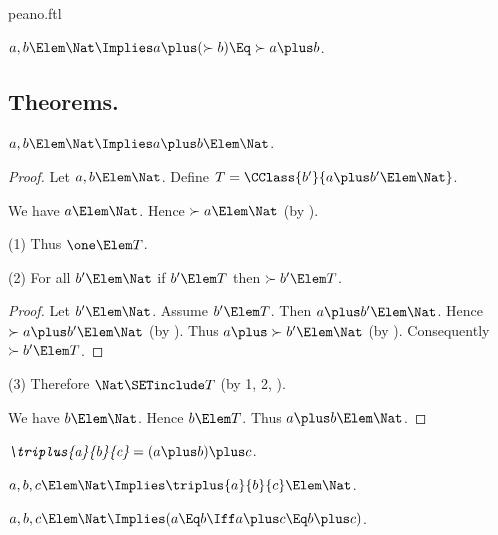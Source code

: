 \documentclass{stex}
\begin{document}
\begin{smodule}{peano.ftl}
\begin{forthel}
  \begin{axiom*}[title=18,name=P18]
    $a,b \Elem \Nat \Implies a \plus (\succ{b}) \Eq \succ{a \plus b}$.
  \end{axiom*}
\end{forthel}


\subsection{Theorems.}


\begin{forthel}
  \begin{theorem*}[title=19,name=P19]
    $a,b \Elem \Nat \Implies a \plus b \Elem \Nat$.
  \end{theorem*}
  \begin{proof}
    Let $a,b \Elem \Nat$.
    Define $T = \CClass{b'}{a \plus b' \Elem \Nat}$.
    
    We have $a \Elem \Nat$.
    Hence $\succ{a} \Elem \Nat$ (by ).
    
    (1) Thus $\one \Elem T$.

    (2) For all $b' \Elem \Nat$ if $b' \Elem T$ then $\succ{b'} \Elem T$.
    \begin{proof}
      Let $b' \Elem \Nat$.
      Assume $b' \Elem T$.
      Then $a \plus b' \Elem \Nat$.
      Hence $\succ{a \plus b'} \Elem \Nat$ (by ).
      Thus $a \plus \succ{b'} \Elem \Nat$ (by ).
      Consequently $\succ{b'} \Elem T$.
    \end{proof}

    (3) Therefore $\Nat \SETinclude T$ (by 1, 2, ).

    We have $b \Elem \Nat$.
    Hence $b \Elem T$.
    Thus $a \plus b \Elem \Nat$.
  \end{proof}

  \begin{definition*}[title=20,for=triplus]
    $\emph{\triplus{a}{b}{c}} = (a \plus b) \plus c$.
  \end{definition*}

  \begin{theorem*}[title=21,name=P21]
    $a,b,c \Elem \Nat \Implies \triplus{a}{b}{c} \Elem \Nat$.
  \end{theorem*}

  \begin{theorem*}[title=22,name=P22]
    $a,b,c \Elem \Nat \Implies (a \Eq b \Iff a \plus c \Eq b \plus c)$.
  \end{theorem*}


\end{forthel}
\end{smodule}
\end{document}
